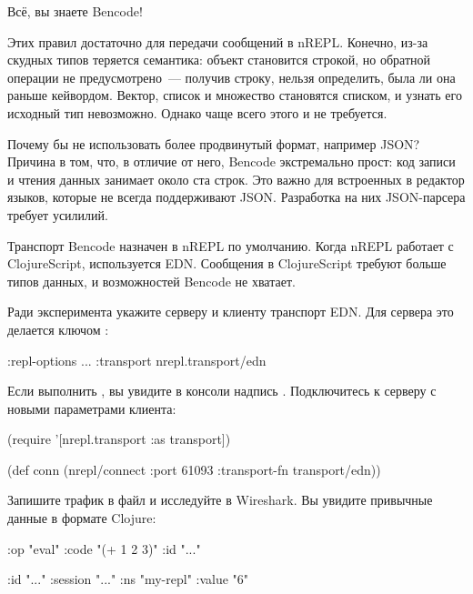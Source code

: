 Всё, вы знаете Bencode!

Этих правил достаточно для передачи сообщений в nREPL. Конечно, из-за скудных типов теряется семантика: объект  становится строкой, но обратной операции не предусмотрено~--- получив строку, нельзя определить, была ли она раньше кейвордом. Вектор, список и множество становятся списком, и узнать его исходный тип невозможно. Однако чаще всего этого и не требуется.

Почему бы не использовать более продвинутый формат, например JSON? Причина в том, что, в отличие от него, Bencode экстремально прост: код записи и чтения данных занимает около ста строк. Это важно для встроенных в редактор языков, которые не всегда поддерживают JSON. Разработка на них JSON-парсера требует усилилий.

Транспорт Bencode назначен в nREPL по умолчанию. Когда nREPL работает с ClojureScript, используется EDN. Сообщения в ClojureScript требуют больше типов данных, и возможностей Bencode не хватает.

Ради эксперимента укажите серверу и клиенту транспорт EDN. Для сервера это делается ключом :

\begin{english}
  \begin{clojure}
:repl-options {...
               :transport nrepl.transport/edn}
  \end{clojure}
\end{english}

Если выполнить , вы увидите в консоли надпись . Подключитесь к серверу с новыми параметрами клиента:

\begin{english}
  \begin{clojure}
(require '[nrepl.transport :as transport])

(def conn (nrepl/connect
           :port 61093
           :transport-fn transport/edn))
  \end{clojure}
\end{english}

Запишите трафик в файл и исследуйте в Wireshark. Вы увидите привычные данные в формате Clojure:

\begin{english}
  \begin{clojure}
{:op "eval"
 :code "(+ 1 2 3)"
 :id "..."}

{:id "..."
 :session "..."
 :ns "my-repl"
 :value "6"}
  \end{clojure}
\end{english}

